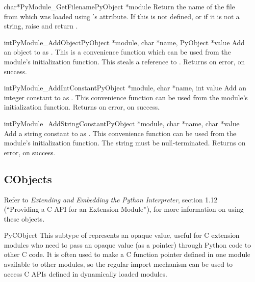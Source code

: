 \documentclass{manual}
\begin{document}
\begin{cfuncdesc}{char*}{PyModule_GetFilename}{PyObject *module}
Return the name of the file from which  was loaded using
's  attribute.  If this is not defined,
or if it is not a string, raise  and return
\NULL.
\end{cfuncdesc}

\begin{cfuncdesc}{int}{PyModule_AddObject}{PyObject *module,
                                           char *name, PyObject *value}
Add an object to  as .  This is a convenience
function which can be used from the module's initialization function.
This steals a reference to .  Returns  on error,
 on success.
\end{cfuncdesc}

\begin{cfuncdesc}{int}{PyModule_AddIntConstant}{PyObject *module,
                                                char *name, int value}
Add an integer constant to  as .  This convenience
function can be used from the module's initialization function.
Returns  on error,  on success.
\end{cfuncdesc}

\begin{cfuncdesc}{int}{PyModule_AddStringConstant}{PyObject *module,
                                                   char *name, char *value}
Add a string constant to  as .  This convenience
function can be used from the module's initialization function.  The
string  must be null-terminated.  Returns  on
error,  on success.
\end{cfuncdesc}


\subsection{CObjects \label{cObjects}}

Refer to \emph{Extending and Embedding the Python Interpreter},
section 1.12 (``Providing a C API for an Extension Module''), for more 
information on using these objects.


\begin{ctypedesc}{PyCObject}
This subtype of  represents an opaque value, useful for
C extension modules who need to pass an opaque value (as a
 pointer) through Python code to other C code.  It is
often used to make a C function pointer defined in one module
available to other modules, so the regular import mechanism can be
used to access C APIs defined in dynamically loaded modules.
\end{ctypedesc}
\end{document}
